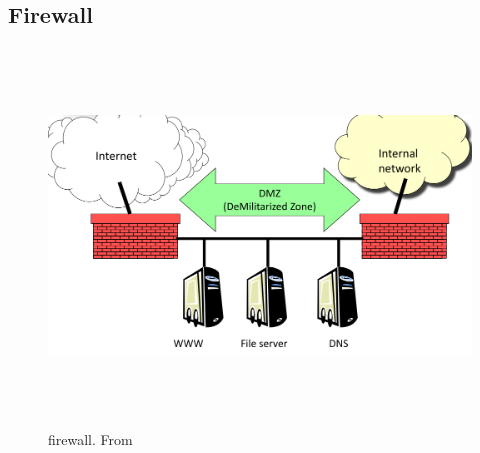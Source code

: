 \subsection{Firewall}
\begin{figure}[h]
    \vspace{10mm}
    \centering
    \includegraphics[width=16cm, height=10cm]{image/firewall.png}
    \caption{firewall. From \cite{}}
\end{figure}

